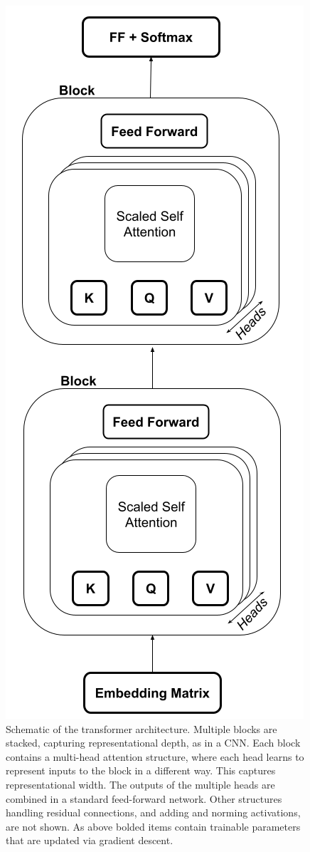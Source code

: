 \begin{figure}[h]
\centering
\includegraphics[scale=.35]{./images/transformerArchitectureSchematic.png}
\caption[Jeff Yoshimi with consultation from Tim Meyer.]{Schematic of the transformer architecture. Multiple blocks are stacked, capturing representational depth, as in a CNN.  Each block contains a multi-head attention structure, where each head learns to represent inputs to the block in a different way. This captures representational width.  The outputs of the multiple heads are combined in a standard feed-forward network. Other structures handling residual connections, and adding and norming activations, are not shown. As above bolded items contain trainable parameters that are updated via gradient descent.}
\label{transformerArchitectureSchematic}
\end{figure}

